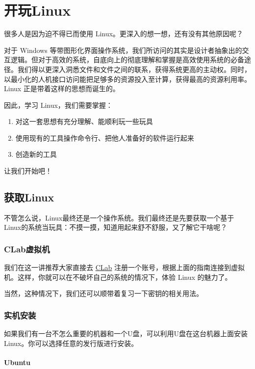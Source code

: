 \documentclass[../main.tex]{subfiles}
\begin{document}
\chapter{开玩Linux}\label{chap:play-with-linux}

很多人是因为迫不得已而使用 Linux。更深入的想一想，还有没有其他原因呢？

对于 Windows 等带图形化界面操作系统，我们所访问的其实是设计者抽象出的交互逻辑。但对于高效的系统，自底向上的彻底理解和掌握是高效使用系统的必备途径。我们得以更深入洞悉文件和文件之间的联系，获得系统更高的主动权。同时，以最小化的人机接口访问能把足够多的资源投入至计算，获得最高的资源利用率。Linux 正是带着这样的思想而诞生的。

因此，学习 Linux，我们需要掌握：

\begin{enumerate}
    \item 对这一套思想有充分理解、能顺利玩一些玩具
    \item 使用现有的工具操作命令行、把他人准备好的软件运行起来
    \item 创造新的工具
\end{enumerate}

让我们开始吧！

\section{获取Linux}

不管怎么说，Linux最终还是一个操作系统。我们最终还是先要获取一个基于Linux的系统当玩具：不摸一摸，知道用起来舒不舒服，又了解它干啥呢？

\subsection{CLab虚拟机}

我们在这一讲推荐大家直接去 \href{https://clab.pku.edu.cn/}{CLab} 注册一个账号，根据上面的指南连接到虚拟机。这样，你就可以在不破坏自己的系统的情况下，体验 Linux 的魅力了。

当然，这种情况下，我们还可以顺带着复习一下密钥的相关用法。

\subsection{实机安装}

如果我们有一台不怎么重要的机器和一个U盘，可以利用U盘在这台机器上面安装Linux。你可以选择任意的发行版进行安装。

\subsubsection{Ubuntu}
\end{document}
